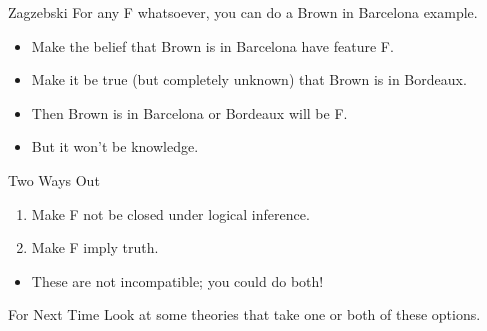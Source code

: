 \documentclass[
  17pt,
  letterpaper,
  ignorenonframetext,
  aspectratio=169,
  handout]{beamer}
\providecommand{\tightlist}{%
  \setlength{\itemsep}{0pt}\setlength{\parskip}{0pt}}\usepackage{longtable,booktabs,array}
\begin{document}
\begin{frame}{Zagzebski}
\protect\hypertarget{zagzebski-1}{}
For any F whatsoever, you can do a Brown in Barcelona example.

\begin{itemize}[<+->]
\tightlist
\item
  Make the belief that Brown is in Barcelona have feature F.
\item
  Make it be true (but completely unknown) that Brown is in Bordeaux.
\item
  Then Brown is in Barcelona or Bordeaux will be F.
\item
  But it won't be knowledge.
\end{itemize}
\end{frame}

\begin{frame}{Two Ways Out}
\protect\hypertarget{two-ways-out}{}
\begin{enumerate}[<+->]
\tightlist
\item
  Make F not be closed under logical inference.
\item
  Make F imply truth.
\end{enumerate}

\begin{itemize}[<+->]
\tightlist
\item
  These are not incompatible; you could do both!
\end{itemize}
\end{frame}

\begin{frame}{For Next Time}
\protect\hypertarget{for-next-time}{}
Look at some theories that take one or both of these options.
\end{frame}
\end{document}
